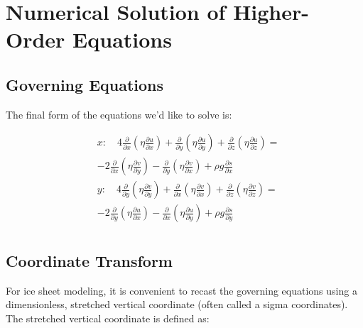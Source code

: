%
%
%
%
%

\section{Numerical Solution of Higher-Order Equations}

\subsection{Governing Equations}
The final form of the equations we'd like to solve is:
 
\begin{align*}
 & x: \quad 4\frac{\partial }{\partial x}\left( \eta \frac{\partial u}{\partial x} \right)+\frac{\partial }{\partial y}\left( \eta \frac{\partial u}{\partial y} \right)+\frac{\partial }{\partial z}\left( \eta \frac{\partial u}{\partial z} \right)= \\
 &-2\frac{\partial }{\partial x}\left( \eta \frac{\partial v}{\partial y} \right)-\frac{\partial }{\partial y}\left( \eta \frac{\partial v}{\partial x} \right)+\rho g\frac{\partial s}{\partial x} \\ 
 & y: \quad 4\frac{\partial }{\partial y}\left( \eta \frac{\partial v}{\partial y} \right)+\frac{\partial }{\partial x}\left( \eta \frac{\partial v}{\partial x} \right)+\frac{\partial }{\partial z}\left( \eta \frac{\partial v}{\partial z} \right)= \\
 & -2\frac{\partial }{\partial y}\left( \eta \frac{\partial u}{\partial x} \right)-\frac{\partial }{\partial x}\left( \eta \frac{\partial u}{\partial y} \right)+\rho g\frac{\partial s}{\partial y} \\ 
\end{align*}

\subsection{Coordinate Transform}
For ice sheet modeling, it is convenient to recast the governing equations using a dimensionless, stretched vertical coordinate (often called a sigma coordinates). The stretched vertical coordinate is defined as:

